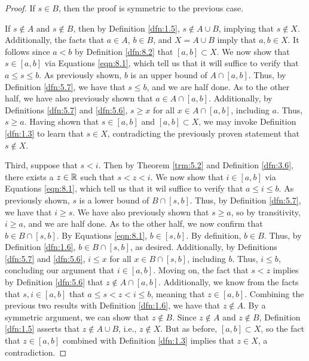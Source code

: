 \documentclass[../main.tex]{subfiles}
\begin{document}
\begin{theorem}
\begin{proof}
        If $s\in B$, then the proof is symmetric to the previous case.\par
        If $s\notin A$ and $s\notin B$, then by Definition \ref{dfn:1.5}, $s\notin A\cup B$, implying that $s\notin X$. Additionally, the facts that $a\in A$, $b\in B$, and $X=A\cup B$ imply that $a,b\in X$. It follows since $a<b$ by Definition \ref{dfn:8.2} that $[a,b]\subset X$. We now show that $s\in[a,b]$ via Equations \ref{eqn:8.1}, which tell us that it will suffice to verify that $a\leq s\leq b$. As previously shown, $b$ is an upper bound of $A\cap[a,b]$. Thus, by Definition \ref{dfn:5.7}, we have that $s\leq b$, and we are half done. As to the other half, we have also previously shown that $a\in A\cap[a,b]$. Additionally, by Definitions \ref{dfn:5.7} and \ref{dfn:5.6}, $s\geq x$ for all $x\in A\cap[a,b]$, including $a$. Thus, $s\geq a$. Having shown that $s\in[a,b]$ and $[a,b]\subset X$, we may invoke Definition \ref{dfn:1.3} to learn that $s\in X$, contradicting the previously proven statement that $s\notin X$.\par\smallskip
        Third, suppose that $s<i$. Then by Theorem \ref{trm:5.2} and Definition \ref{dfn:3.6}, there exists a $z\in\mathbb{R}$ such that $s<z<i$. We now show that $i\in[a,b]$ via Equations \ref{eqn:8.1}, which tell us that it wil suffice to verify that $a\leq i\leq b$. As previously shown, $s$ is a lower bound of $B\cap[s,b]$. Thus, by Definition \ref{dfn:5.7}, we have that $i\geq s$. We have also previously shown that $s\geq a$, so by transitivity, $i\geq a$, and we are half done. As to the other half, we now confirm that $b\in B\cap[s,b]$. By Equations \ref{eqn:8.1}, $b\in[s,b]$. By definition, $b\in B$. Thus, by Definition \ref{dfn:1.6}, $b\in B\cap[s,b]$, as desired. Additionally, by Definitions \ref{dfn:5.7} and \ref{dfn:5.6}, $i\leq x$ for all $x\in B\cap[s,b]$, including $b$. Thus, $i\leq b$, concluding our argument that $i\in[a,b]$. Moving on, the fact that $s<z$ implies by Definition \ref{dfn:5.6} that $z\notin A\cap[a,b]$. Additionally, we know from the facts that $s,i\in[a,b]$ that $a\leq s<z<i\leq b$, meaning that $z\in[a,b]$. Combining the previous two results with Definition \ref{dfn:1.6}, we have that $z\notin A$. By a symmetric argument, we can show that $z\notin B$. Since $z\notin A$ and $z\notin B$, Definition \ref{dfn:1.5} asserts that $z\notin A\cup B$, i.e., $z\notin X$. But as before, $[a,b]\subset X$, so the fact that $z\in[a,b]$ combined with Definition \ref{dfn:1.3} implies that $z\in X$, a contradiction.
    \end{proof}
\end{theorem}
\end{document}
